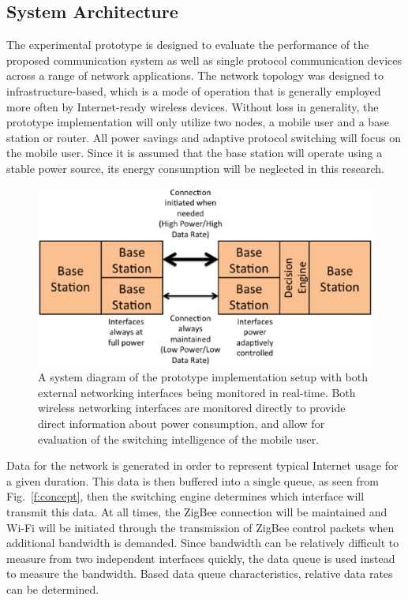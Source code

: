 \documentclass[conference]{IEEEtran}
\begin{document}
\subsection{System Architecture}
The experimental prototype is designed to evaluate the performance
of the proposed communication system as well as single protocol
communication devices across a range of network applications. The
network topology was designed to infrastructure-based, which is a
mode of operation that is generally employed more often by
Internet-ready wireless devices.  Without loss in generality, the
prototype implementation will only utilize two nodes, a mobile user
and a base station or router. All power savings and adaptive
protocol switching will focus on the mobile user. Since it is
assumed that the base station will operate using a stable power
source, its energy consumption will be neglected in this research.
\begin{figure}[t]
\begin{center}
\includegraphics[scale=0.35]{system_diagram.eps}
\caption{A system diagram of the prototype implementation setup with
both external networking interfaces being monitored in real-time.
Both wireless networking interfaces are monitored directly to
provide direct information about power consumption, and allow for
evaluation of the switching intelligence of the mobile user.}
\end{center}
\end{figure}

Data for the network is generated in order to represent typical
Internet usage for a given duration.  This data is then buffered
into a single queue, as seen from Fig.~\ref{f:concept}, then the
switching engine determines which interface will transmit this data.
At all times, the ZigBee connection will be maintained and Wi-Fi
will be initiated through the transmission of ZigBee control packets
when additional bandwidth is demanded.  Since bandwidth can be
relatively difficult to measure from two independent interfaces
quickly, the data queue is used instead to measure the bandwidth.
Based data queue characteristics, relative data rates can be
determined.
\end{document}
